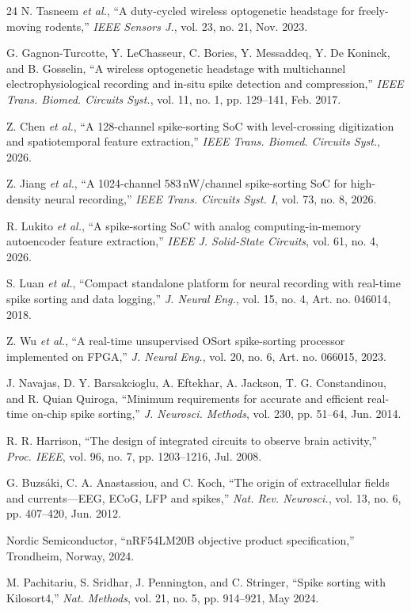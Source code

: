 \documentclass[11pt]{article}
\begin{document}
\begin{thebibliography}{24}
 N. Tasneem \emph{et al.}, ``A duty-cycled wireless optogenetic headstage for freely-moving rodents,'' \emph{IEEE Sensors J.}, vol. 23, no. 21, Nov. 2023.

 G. Gagnon-Turcotte, Y. LeChasseur, C. Bories, Y. Messaddeq, Y. De Koninck, and B. Gosselin, ``A wireless optogenetic headstage with multichannel electrophysiological recording and in-situ spike detection and compression,'' \emph{IEEE Trans. Biomed. Circuits Syst.}, vol. 11, no. 1, pp. 129--141, Feb. 2017.

 Z. Chen \emph{et al.}, ``A 128-channel spike-sorting SoC with level-crossing digitization and spatiotemporal feature extraction,'' \emph{IEEE Trans. Biomed. Circuits Syst.}, 2026.

 Z. Jiang \emph{et al.}, ``A 1024-channel 583\,nW/channel spike-sorting SoC for high-density neural recording,'' \emph{IEEE Trans. Circuits Syst. I}, vol. 73, no. 8, 2026.

 R. Lukito \emph{et al.}, ``A spike-sorting SoC with analog computing-in-memory autoencoder feature extraction,'' \emph{IEEE J. Solid-State Circuits}, vol. 61, no. 4, 2026.

 S. Luan \emph{et al.}, ``Compact standalone platform for neural recording with real-time spike sorting and data logging,'' \emph{J. Neural Eng.}, vol. 15, no. 4, Art. no. 046014, 2018.

 Z. Wu \emph{et al.}, ``A real-time unsupervised OSort spike-sorting processor implemented on FPGA,'' \emph{J. Neural Eng.}, vol. 20, no. 6, Art. no. 066015, 2023.

 J. Navajas, D. Y. Barsakcioglu, A. Eftekhar, A. Jackson, T. G. Constandinou, and R. Quian Quiroga, ``Minimum requirements for accurate and efficient real-time on-chip spike sorting,'' \emph{J. Neurosci. Methods}, vol. 230, pp. 51--64, Jun. 2014.

 R. R. Harrison, ``The design of integrated circuits to observe brain activity,'' \emph{Proc. IEEE}, vol. 96, no. 7, pp. 1203--1216, Jul. 2008.

 G. Buzs\'aki, C. A. Anastassiou, and C. Koch, ``The origin of extracellular fields and currents---EEG, ECoG, LFP and spikes,'' \emph{Nat. Rev. Neurosci.}, vol. 13, no. 6, pp. 407--420, Jun. 2012.

 Nordic Semiconductor, ``nRF54LM20B objective product specification,'' Trondheim, Norway, 2024.

 M. Pachitariu, S. Sridhar, J. Pennington, and C. Stringer, ``Spike sorting with Kilosort4,'' \emph{Nat. Methods}, vol. 21, no. 5, pp. 914--921, May 2024.

\end{thebibliography}
\end{document}

